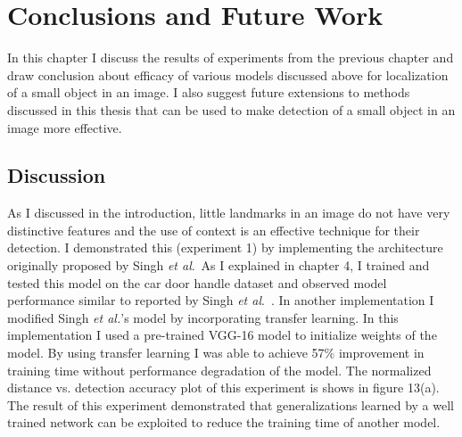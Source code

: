 \documentclass [11pt,letterpaper ,twoside ,openany ]{report}
\begin{document}
    \chapter{Conclusions and Future Work}
    \doublespacing

    In this chapter I discuss the results of experiments from the previous chapter and draw conclusion about efficacy of various models discussed above for localization of a small object in an image. I also suggest future extensions to methods discussed in this thesis that can be used to make detection of a small object in an image more effective.

    \section{Discussion}

    As I discussed in the introduction, little landmarks in an image do not have very distinctive features and the use of context is an effective technique for their detection. I demonstrated this (experiment 1) by implementing the architecture originally proposed by Singh \textit{et al}.\ As I explained in chapter 4, I trained and tested this model on the car door handle dataset and observed model performance similar to reported by Singh \textit{et al}.\ \cite{Singh_2016_CVPR}. In another implementation I modified Singh \textit{et al.}'s model \cite{Singh_2016_CVPR} by incorporating transfer learning. In this implementation I used a pre-trained VGG-16 model \cite{simonyan2014very} to initialize weights of the model. By using transfer learning I was able to achieve 57\% improvement in training time without performance degradation of the model. The normalized distance vs. detection accuracy plot of this experiment is shows in figure 13(a). The result of this experiment demonstrated that generalizations learned by a well trained network can be exploited to reduce the training time of another model.
\end{document}
